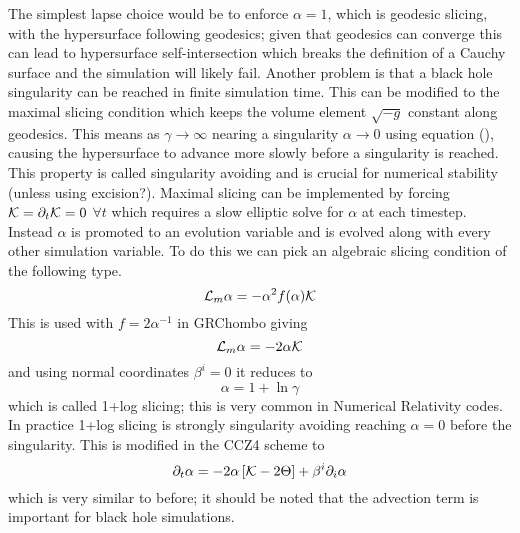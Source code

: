 The simplest lapse choice would be to enforce $\alpha=1$, which is geodesic slicing, with the hypersurface following geodesics; given that geodesics can converge this can lead to hypersurface self-intersection which breaks the definition of a Cauchy surface and the simulation will likely fail. Another problem is that a black hole singularity can be reached in finite simulation time. This can be modified to the maximal slicing condition which keeps the volume element $\sqrt{-g}$ constant along geodesics. This means as $\gamma\rightarrow\infty$ nearing a singularity $\alpha\rightarrow0$ using equation (), causing the hypersurface to advance more slowly before a singularity is reached. This property is called singularity avoiding and is crucial for numerical stability (unless using excision?). 
Maximal slicing can be implemented by forcing $\mathcal{K} = \partial_t \mathcal{K} = 0$ $\forall t$ which requires a slow elliptic solve for $\alpha$ at each timestep. Instead $\alpha$ is promoted to an evolution variable and is evolved along with every other simulation variable. To do this we can pick an algebraic slicing condition of the following type.
\begin{equation}\mathcal{L}_m \alpha = -\alpha^2 f(\alpha)\mathcal{K} \end{equation}
This is used with $f = 2\alpha^{-1}$ in GRChombo giving
\begin{equation}\mathcal{L}_m \alpha = -2\alpha \mathcal{K} \end{equation}
and using normal coordinates $\beta^i=0$ it reduces to 
\begin{equation} \alpha = 1+ \ln \gamma\end{equation}
which is called 1+log slicing; this is very common in Numerical Relativity codes. In practice 1+log slicing is strongly singularity avoiding reaching $\alpha=0$ before the singularity. This is modified in the CCZ4 scheme to 
\begin{equation}\partial_t \alpha = -2\alpha\left[ \mathcal{K}-2\Theta\right] + \beta^i \partial_i \alpha\end{equation}
which is very similar to before; it should be noted that the advection term is important for black hole simulations.

